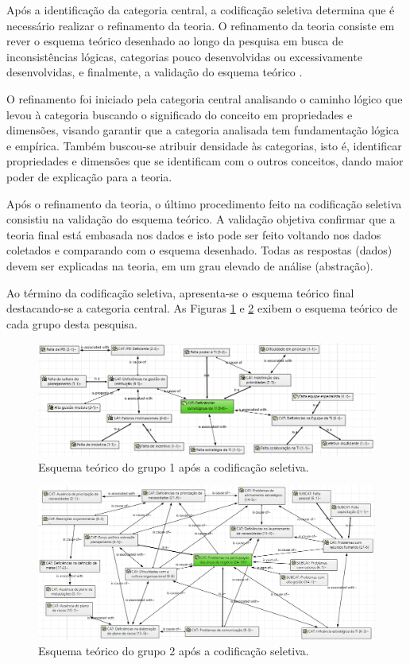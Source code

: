 Após a identificação da categoria central, a codificação seletiva determina que é necessário realizar o refinamento da teoria. O refinamento da teoria consiste em rever o esquema teórico desenhado ao longo da pesquisa em busca de inconsistências lógicas, categorias pouco desenvolvidas ou excessivamente desenvolvidas, e finalmente, a validação do esquema teórico \cite{corbin:98}. 

O refinamento foi iniciado pela categoria central analisando o caminho lógico que levou à categoria buscando o significado do conceito em propriedades e dimensões, visando garantir que a categoria analisada tem fundamentação lógica e empírica. Também buscou-se atribuir densidade às categorias, isto é, identificar propriedades e dimensões que se identificam com o outros conceitos, dando maior poder de explicação para a teoria. 

Após o refinamento da teoria, o último procedimento feito na codificação seletiva consistiu na validação do esquema teórico. A validação objetiva confirmar que a teoria final está embasada nos dados e isto pode ser feito voltando nos dados coletados e comparando com o esquema desenhado. Todas as respostas (dados) devem ser explicadas na teoria, em um grau elevado de análise (abstração).


Ao término da codificação seletiva, apresenta-se o esquema teórico final destacando-se a categoria central. As Figuras \ref{figura:sc_grupo1} e \ref{figura:sc_grupo2} exibem o esquema teórico de cada grupo desta pesquisa.

\begin{figure}[h!]
\centering %
\includegraphics[width=15cm, frame]{figuras/sc_grupo1.PNG}
\caption{Esquema teórico do grupo 1 após a codificação seletiva.}
\label{figura:sc_grupo1}
\end{figure}

\begin{figure}[h!]
\centering %
\includegraphics[width=15cm, frame]{figuras/sc_grupo2.PNG}
\caption{Esquema teórico do grupo 2 após a codificação seletiva.}
\label{figura:sc_grupo2}
\end{figure}



